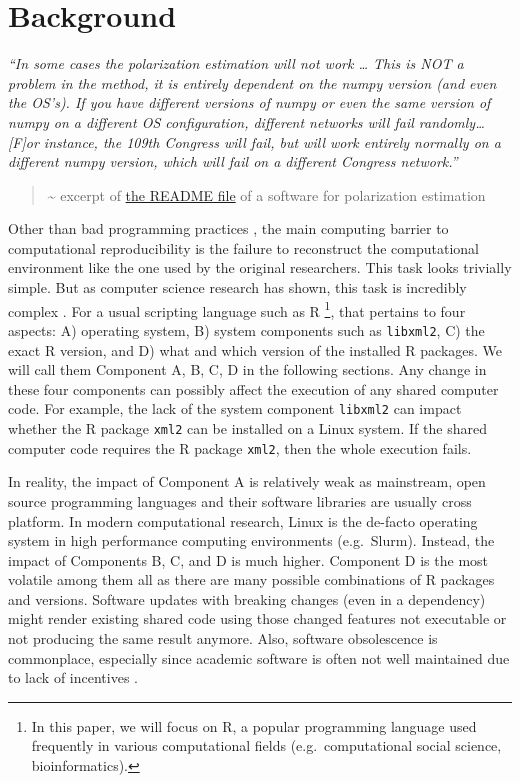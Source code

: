 \documentclass[
  10pt,
  letterpaper,
]{article}
\begin{document}
\linenumbers\hypertarget{background}{%
\section{Background}\label{background}}

\emph{``In some cases the polarization estimation will not work \ldots{}
This is \emph{NOT} a problem in the method, it is entirely dependent on
the numpy version (and even the OS's). If you have different versions of
numpy or even the same version of numpy on a different OS configuration,
different networks will fail randomly\ldots{} {[}F{]}or instance, the
109th Congress will fail, but will work entirely normally on a different
numpy version, which will fail on a different Congress network.''}

\begin{quote}
\textasciitilde{} excerpt of
\href{https://www.michelecoscia.com/?page_id=2105}{the README file} of a
software for polarization estimation
\end{quote}

Other than bad programming practices \citep{trisovic:2022}, the main
computing barrier to computational reproducibility is the failure to
reconstruct the computational environment like the one used by the
original researchers. This task looks trivially simple. But as computer
science research has shown, this task is incredibly complex
\citep{abate:2015:MCR, dolstra:2010:N}. For a usual scripting language
such as R \footnote{In this paper, we will focus on R, a popular
  programming language used frequently in various computational fields
  (e.g.~computational social science, bioinformatics).}, that pertains
to four aspects: A) operating system, B) system components such as
\texttt{libxml2}, C) the exact R version, and D) what and which version
of the installed R packages. We will call them Component A, B, C, D in
the following sections. Any change in these four components can possibly
affect the execution of any shared computer code. For example, the lack
of the system component \texttt{libxml2} can impact whether the R
package \texttt{xml2} can be installed on a Linux system. If the shared
computer code requires the R package \texttt{xml2}, then the whole
execution fails.

In reality, the impact of Component A is relatively weak as mainstream,
open source programming languages and their software libraries are
usually cross platform. In modern computational research, Linux is the
de-facto operating system in high performance computing environments
(e.g.~Slurm). Instead, the impact of Components B, C, and D is much
higher. Component D is the most volatile among them all as there are
many possible combinations of R packages and versions. Software updates
with breaking changes (even in a dependency) might render existing
shared code using those changed features not executable or not producing
the same result anymore. Also, software obsolescence is commonplace,
especially since academic software is often not well maintained due to
lack of incentives \citep{merow:2023:B}.
\end{document}
